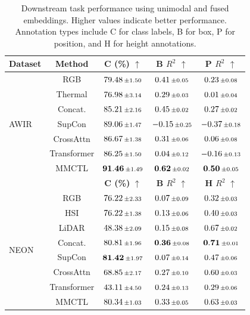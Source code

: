 \documentclass[lettersize,journal]{IEEEtran}
\begin{document}
\begin{table}[t]
\centering
\caption{
Downstream task performance using unimodal and fused embeddings. Higher values indicate better performance. Annotation types include C for class labels, B for box, P for position, and H for height annotations.
}
\label{tab:downstream_performance_tasks}
\begin{tabular}{l c c c c}
\toprule
\textbf{Dataset} & \textbf{Method}
& \textbf{C (\%)} $\uparrow$
& \textbf{B $R^2$} $\uparrow$
& \textbf{P $R^2$} $\uparrow$ \\
\midrule
\multirow{7}{*}{AWIR}
& RGB        
& $79.48 \,\scriptstyle\pm\,\!1.50$ 
& $0.41 \,\scriptstyle\pm\,\!0.05$ 
& $0.23 \,\scriptstyle\pm\,\!0.08$ \\
& Thermal    
& $76.98\,\scriptstyle\pm\,\!3.14$ 
& $0.29\,\scriptstyle\pm\,\!0.03$ 
& $0.01 \,\scriptstyle\pm\,\!0.04$ \\
\cmidrule(lr){2-5}
& Concat.    
& $85.21 \,\scriptstyle\pm\,\!2.16$ 
& $0.45\,\scriptstyle\pm\,\!0.02$ 
& $0.27 \,\scriptstyle\pm\,\!0.02$ \\
& SupCon  
& $89.06 \,\scriptstyle\pm\,\!1.47$ 
& $-0.15\,\scriptstyle\pm\,\!0.25$ 
& $-0.37 \,\scriptstyle\pm\,\!0.18$ \\
& CrossAttn    
& $86.67 \,\scriptstyle\pm\,\!1.38$ 
& $0.31\,\scriptstyle\pm\,\!0.06$ 
& $0.06 \,\scriptstyle\pm\,\!0.08$ \\
& Transformer    
& $86.25 \,\scriptstyle\pm\,\!1.50$ 
& $0.04\,\scriptstyle\pm\,\!0.12$ 
& $-0.16 \,\scriptstyle\pm\,\!0.13$ \\
\cmidrule(lr){2-5}
& MMCTL      
& $\mathbf{91.46}\,\scriptstyle\pm\,\!1.49$ 
& $\mathbf{0.62}\,\scriptstyle\pm\,\!0.02$ 
& $\mathbf{0.50}\,\scriptstyle\pm\,\!0.05$ \\
\midrule
\multicolumn{2}{l}{}
& \textbf{C (\%)} $\uparrow$
& \textbf{B $R^2$} $\uparrow$
& \textbf{H $R^2$} $\uparrow$ \\
\midrule
\multirow{8}{*}{NEON}
& RGB        
& $76.22\,\scriptstyle\pm\,\!2.33$ 
& $0.07 \,\scriptstyle\pm\,\!0.09$ 
& $0.32 \,\scriptstyle\pm\,\!0.03$ \\
& HSI        
& $76.22 \,\scriptstyle\pm\,\!1.38$ 
& $0.13 \,\scriptstyle\pm\,\!0.06$ 
& $0.40\,\scriptstyle\pm\,\!0.03$ \\
& LiDAR      
& $48.38 \,\scriptstyle\pm\,\!2.09$ 
& $0.15 \,\scriptstyle\pm\,\!0.08$ 
& $0.67 \,\scriptstyle\pm\,\!0.02$ \\
\cmidrule(lr){2-5}
& Concat.    
& $80.81 \,\scriptstyle\pm\,\!1.96$ 
& $\mathbf{0.36} \,\scriptstyle\pm\,\!0.08$ 
& $\mathbf{0.71} \,\scriptstyle\pm\,\!0.01$ \\
& SupCon  
& $\mathbf{81.42} \,\scriptstyle\pm\,\!1.97$ 
& $0.07 \,\scriptstyle\pm\,\!0.14$ 
& $0.47 \,\scriptstyle\pm\,\!0.06$ \\
& CrossAttn    
& $68.85 \,\scriptstyle\pm\,\!2.17$ 
& $0.27\,\scriptstyle\pm\,\!0.10$ 
& $0.60 \,\scriptstyle\pm\,\!0.03$ \\
& Transformer    
& $43.11 \,\scriptstyle\pm\,\!4.50$ 
& $0.24\,\scriptstyle\pm\,\!0.13$ 
& $0.29 \,\scriptstyle\pm\,\!0.06$ \\
\cmidrule(lr){2-5}  
& MMCTL      
& $80.34 \,\scriptstyle\pm\,\!1.03$ 
& $0.33 \,\scriptstyle\pm\,\!0.05$ 
& $0.63 \,\scriptstyle\pm\,\!0.03$ \\
\bottomrule
\end{tabular}
\end{table}
\end{document}
